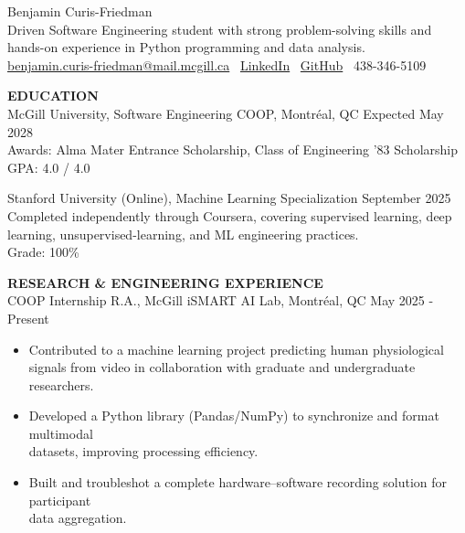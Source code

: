\documentclass[11pt]{article}
\begin{document}
\raggedright 

\begin{center}
{\LARGE Benjamin Curis-Friedman} \\
Driven Software Engineering student with strong problem-solving skills and hands-on experience in Python programming and data analysis. \\
\href{mailto:benjamin.curis-friedman@mail.mcgill.ca}{benjamin.curis-friedman@mail.mcgill.ca} \textbar\ 
\href{https://www.linkedin.com/in/benjaminc-f}{LinkedIn} \textbar\ 
\href{https://github.com/Benjamincf0}{GitHub} \textbar\ 438-346-5109
\end{center}

\vspace{-1mm}
\textbf{EDUCATION} \\
\vspace{1mm}
McGill University, Software Engineering COOP, Montréal, QC \hfill Expected May 2028 \\
Awards: Alma Mater Entrance Scholarship, Class of Engineering '83 Scholarship \\
GPA: 4.0 / 4.0

Stanford University (Online), Machine Learning Specialization \hfill September 2025 \\
Completed independently through Coursera, covering supervised learning, deep learning, unsupervised-learning, and ML engineering practices.\\
Grade: 100\%

\vspace{1mm}
\textbf{RESEARCH \& ENGINEERING EXPERIENCE} \\
\vspace{1mm}
COOP Internship R.A., McGill iSMART AI Lab, Montréal, QC \hfill May 2025 - Present
\vspace{-2mm}
\begin{itemize}
    \item Contributed to a machine learning project predicting human physiological\\ signals from video in collaboration with graduate and undergraduate researchers.
    \item Developed a Python library (Pandas/NumPy) to synchronize and format multimodal\\ datasets, improving processing efficiency.
    \item Built and troubleshot a complete hardware–software recording solution for participant\\ data aggregation.
\end{itemize}
\end{document}
